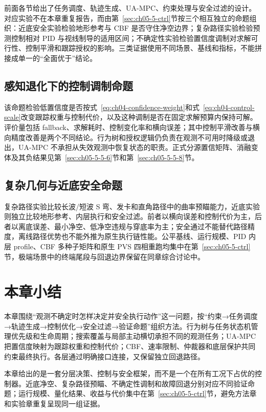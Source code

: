 前面各节给出了任务调度、轨迹生成、UA-MPC、约束处理与安全过滤的设计。对应实验不在本章重复报告，而由第~\ref{sec:ch05-5-ctrl}节按三个相互独立的命题组织：近底安全实验检验地形参考与 CBF 是否守住净空边界；复杂路径实验检验预测控制相对 PID 与视线制导的适用区间；不确定性实验检验置信度调制对求解可行性、控制平滑和跟踪授权的影响。三类证据使用不同场景、基线和指标，不能拼接成单一的``全面优于''结论。

\subsection{感知退化下的控制调制命题}\label{sec:ch04-4-5-1}

该命题检验低置信度是否按式~\eqref{eq:ch04-confidence-weight}和式~\eqref{eq:ch04-control-scale}改变跟踪权重与控制代价，以及这种调制是否在固定求解预算内保持可解。评价量包括 fallback、求解耗时、控制变化率和横向误差；其中控制平滑改善与横向精度改善是两个不同结论。行为树和授权逻辑仍负责在观测不可用时降级或退出，UA-MPC 不承担从失效观测中恢复状态的职责。正式分源置信矩阵、消融变体及其负结果见第~\ref{sec:ch05-5-5-6}节和第~\ref{sec:ch05-5-5-8}节。

\subsection{复杂几何与近底安全命题}\label{sec:ch04-4-5-2}

复杂路径实验比较长波/短波 S 弯、发卡和直角路径中的曲率预瞄能力，近底实验则独立比较地形参考、内层执行和安全过滤。前者以横向误差和控制代价为主，后者以离底误差、最小净空、低净空违规与穿底率为主；安全通过不能替代路径精度，离线路径优势也不能外推为原生执行链性能。公平基线、运行规模、PID 内层 profile、CBF 多种子矩阵和原生 PVS 四相重跑均集中在第~\ref{sec:ch05-5-ctrl}节，极端场景中的终端尾段与回退边界保留在同章综合讨论中。

\section{本章小结}\label{sec:ch04-4-6}

本章围绕``观测不确定时怎样决定并安全执行动作''这一问题，按``约束→任务调度→轨迹生成→控制优化→安全过滤→验证命题''组织方法。行为树与任务状态机管理优先级和生命周期；搜索覆盖与局部主动横切承担不同的观测任务；UA-MPC 把置信度映射为跟踪权重和控制代价；CBF、速率限制、仲裁器和底层保护共同约束最终执行。各层通过明确接口连接，又保留独立回退路径。

本章给出的是一套分层决策、控制与安全框架，而不是一个在所有工况下占优的控制器。近底净空、复杂路径预瞄、不确定性调制和故障回退分别对应不同验证命题；运行规模、量化结果、收益与代价集中在第~\ref{sec:ch05-5-ctrl}节，避免方法章和实验章重复呈现同一组证据。
